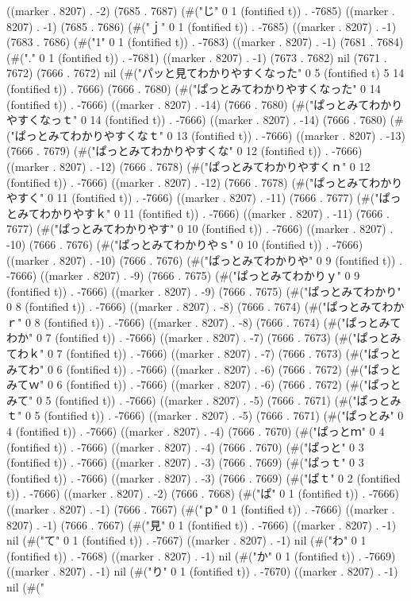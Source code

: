 ((marker . 8207) . -2) (7685 . 7687) (#("じ" 0 1 (fontified t)) . -7685) ((marker . 8207) . -1) (7685 . 7686) (#("ｊ" 0 1 (fontified t)) . -7685) ((marker . 8207) . -1) (7683 . 7686) (#("1" 0 1 (fontified t)) . -7683) ((marker . 8207) . -1) (7681 . 7684) (#("." 0 1 (fontified t)) . -7681) ((marker . 8207) . -1) (7673 . 7682) nil (7671 . 7672) (7666 . 7672) nil (#("パッと見てわかりやすくなった" 0 5 (fontified t) 5 14 (fontified t)) . 7666) (7666 . 7680) (#("ぱっとみてわかりやすくなった" 0 14 (fontified t)) . -7666) ((marker . 8207) . -14) (7666 . 7680) (#("ぱっとみてわかりやすくなっｔ" 0 14 (fontified t)) . -7666) ((marker . 8207) . -14) (7666 . 7680) (#("ぱっとみてわかりやすくなｔ" 0 13 (fontified t)) . -7666) ((marker . 8207) . -13) (7666 . 7679) (#("ぱっとみてわかりやすくな" 0 12 (fontified t)) . -7666) ((marker . 8207) . -12) (7666 . 7678) (#("ぱっとみてわかりやすくｎ" 0 12 (fontified t)) . -7666) ((marker . 8207) . -12) (7666 . 7678) (#("ぱっとみてわかりやすく" 0 11 (fontified t)) . -7666) ((marker . 8207) . -11) (7666 . 7677) (#("ぱっとみてわかりやすｋ" 0 11 (fontified t)) . -7666) ((marker . 8207) . -11) (7666 . 7677) (#("ぱっとみてわかりやす" 0 10 (fontified t)) . -7666) ((marker . 8207) . -10) (7666 . 7676) (#("ぱっとみてわかりやｓ" 0 10 (fontified t)) . -7666) ((marker . 8207) . -10) (7666 . 7676) (#("ぱっとみてわかりや" 0 9 (fontified t)) . -7666) ((marker . 8207) . -9) (7666 . 7675) (#("ぱっとみてわかりｙ" 0 9 (fontified t)) . -7666) ((marker . 8207) . -9) (7666 . 7675) (#("ぱっとみてわかり" 0 8 (fontified t)) . -7666) ((marker . 8207) . -8) (7666 . 7674) (#("ぱっとみてわかｒ" 0 8 (fontified t)) . -7666) ((marker . 8207) . -8) (7666 . 7674) (#("ぱっとみてわか" 0 7 (fontified t)) . -7666) ((marker . 8207) . -7) (7666 . 7673) (#("ぱっとみてわｋ" 0 7 (fontified t)) . -7666) ((marker . 8207) . -7) (7666 . 7673) (#("ぱっとみてわ" 0 6 (fontified t)) . -7666) ((marker . 8207) . -6) (7666 . 7672) (#("ぱっとみてｗ" 0 6 (fontified t)) . -7666) ((marker . 8207) . -6) (7666 . 7672) (#("ぱっとみて" 0 5 (fontified t)) . -7666) ((marker . 8207) . -5) (7666 . 7671) (#("ぱっとみｔ" 0 5 (fontified t)) . -7666) ((marker . 8207) . -5) (7666 . 7671) (#("ぱっとみ" 0 4 (fontified t)) . -7666) ((marker . 8207) . -4) (7666 . 7670) (#("ぱっとｍ" 0 4 (fontified t)) . -7666) ((marker . 8207) . -4) (7666 . 7670) (#("ぱっと" 0 3 (fontified t)) . -7666) ((marker . 8207) . -3) (7666 . 7669) (#("ぱっｔ" 0 3 (fontified t)) . -7666) ((marker . 8207) . -3) (7666 . 7669) (#("ぱｔ" 0 2 (fontified t)) . -7666) ((marker . 8207) . -2) (7666 . 7668) (#("ぱ" 0 1 (fontified t)) . -7666) ((marker . 8207) . -1) (7666 . 7667) (#("ｐ" 0 1 (fontified t)) . -7666) ((marker . 8207) . -1) (7666 . 7667) (#("見" 0 1 (fontified t)) . -7666) ((marker . 8207) . -1) nil (#("て" 0 1 (fontified t)) . -7667) ((marker . 8207) . -1) nil (#("わ" 0 1 (fontified t)) . -7668) ((marker . 8207) . -1) nil (#("か" 0 1 (fontified t)) . -7669) ((marker . 8207) . -1) nil (#("り" 0 1 (fontified t)) . -7670) ((marker . 8207) . -1) nil (#("
